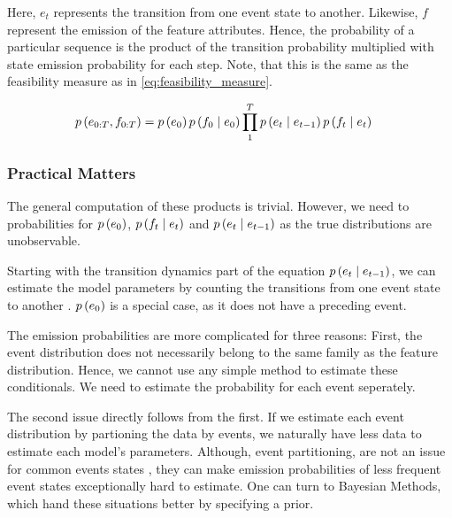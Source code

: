 \documentclass[./../../paper.tex]{subfiles}
\begin{document}

% 


\noindent Here, $e_t$ represents the transition from one event state to another. Likewise, $f$ represent the emission of the feature attributes.  Hence, the probability of a particular sequence is the product of the transition probability multiplied with state emission probability for each step. Note, that this is the same as the feasibility measure as in \autoref{eq:feasibility_measure}. 

\begin{align}
    p\left(e_{0:T},f_{0:T}\right) & = p\left(e_0\right)p\left(f_0 \mid e_0\right)\prod_1^T p\left(e_t \mid e_{t-1}\right) p\left(f_t \mid e_t\right)
\end{align}


\subsubsection{Practical Matters}
The general computation of these products is trivial. However, we need to probabilities for $p\left(e_0\right)$, $p\left(f_t \mid e_t\right)$ and $p\left(e_t \mid e_{t-1}\right)$ as the true distributions are unobservable.

Starting with the transition dynamics part of the equation $p\left(e_t \mid e_{t-1}\right)$, we can estimate the model parameters by counting the transitions from one event state  to another . $p\left(e_0\right)$ is a special case, as it does not have a preceding event.

The emission probabilities are more complicated for three reasons: First, the event distribution does not necessarily belong to the same family as the feature distribution. Hence, we cannot use any simple method to estimate these conditionals. We need to estimate the probability for each event seperately. 

The second issue directly follows from the first. If we estimate each event distribution by partioning the data by events, we naturally have less data to estimate each model's parameters. Although, event partitioning, are not an issue for common events states , they can make emission probabilities of less frequent event states exceptionally hard to estimate.
One can turn to Bayesian Methods, which hand these situations better by specifying a prior.
\end{document}
